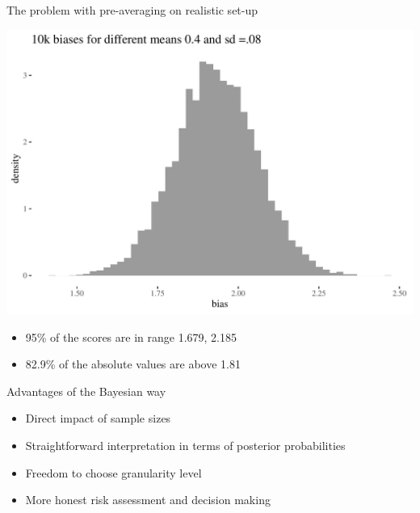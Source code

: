 \documentclass[
  10pt,
  ignorenonframetext,
  x11names, dvipsnames, bibspacing,natbib, table]{beamer}
\providecommand{\tightlist}{%
  \setlength{\itemsep}{0pt}\setlength{\parskip}{0pt}}
\begin{document}
\begin{frame}{The problem with pre-averaging on realistic set-up}
\protect\hypertarget{the-problem-with-pre-averaging-on-realistic-set-up-3}{}
\vspace{1mm}
\footnotesize

\begin{center}\includegraphics[width=0.9\linewidth]{presentationBoston_files/figure-beamer/unnamed-chunk-16-1} \end{center}
\vspace{1mm}
\footnotesize

\normalsize

\footnotesize

\vspace{-2mm}

\begin{itemize}
\tightlist
\item
  95\% of the scores are in range 1.679, 2.185
\item
  82.9\% of the absolute values are above 1.81
\end{itemize}
\end{frame}

\begin{frame}{Advantages of the Bayesian way}
\protect\hypertarget{advantages-of-the-bayesian-way}{}
\begin{itemize}
\tightlist
\item
  Direct impact of sample sizes
\item
  Straightforward interpretation in terms of posterior probabilities
\item
  Freedom to choose granularity level
\item
  More honest risk assessment and decision making
\end{itemize}
\end{frame}
\end{document}
